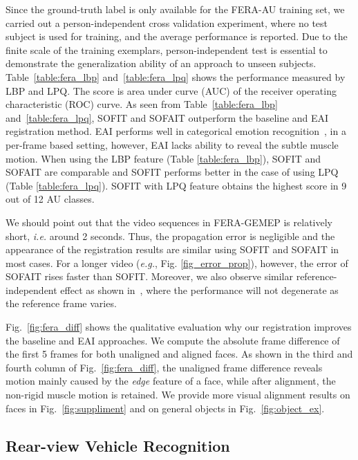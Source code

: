 \documentclass[10pt,journal]{IEEEtran}
\begin{document}
Since the ground-truth label is only available for the FERA-AU training set, we carried out a person-independent cross validation experiment, where no test subject is used for training, and the average performance is reported. Due to the finite scale of the training exemplars, person-independent test is essential to demonstrate the generalization ability of an approach to unseen subjects. Table~\ref{table:fera_lbp} and~\ref{table:fera_lpq} shows the performance measured by LBP and LPQ. The score is area under curve (AUC) of the receiver operating characteristic (ROC) curve. As seen from Table~\ref{table:fera_lbp} and~\ref{table:fera_lpq}, SOFIT and SOFAIT outperform the baseline and EAI registration method. EAI performs well in categorical emotion recognition~\cite{Yang_SMCB12}, in a per-frame based setting, however, EAI lacks ability to reveal the subtle muscle motion. When using the LBP feature (Table \ref{table:fera_lbp}), SOFIT and SOFAIT are comparable and SOFIT performs better in the case of using LPQ (Table \ref{table:fera_lpq}). SOFIT with LPQ feature obtains the highest score in 9 out of 12 AU classes. 

We should point out that the video sequences in FERA-GEMEP is relatively short, \textit{i.e.} around 2 seconds. Thus, the propagation error is negligible and the appearance of the registration results are similar using SOFIT and SOFAIT in most cases. For a longer video (\textit{e.g.}, Fig. \ref{fig_error_prop}), however, the error of SOFAIT rises faster than SOFIT. Moreover, we also observe similar reference-independent effect as shown in~\cite{Yang_FG13}, where the performance will not degenerate as the reference frame varies. 

Fig.~\ref{fig:fera_diff} shows the qualitative evaluation why our registration improves the baseline and EAI approaches. We compute the absolute frame difference of the first 5 frames for both unaligned and aligned faces. As shown in the third and fourth column of Fig.~\ref{fig:fera_diff}, the unaligned frame difference reveals motion mainly caused by the \textit{edge} feature of a face, while after alignment, the non-rigid muscle motion is retained. We provide more visual alignment results on faces in Fig.~\ref{fig:suppliment} and on general objects in Fig.~\ref{fig:object_ex}.



\subsection{Rear-view Vehicle Recognition}
\end{document}

